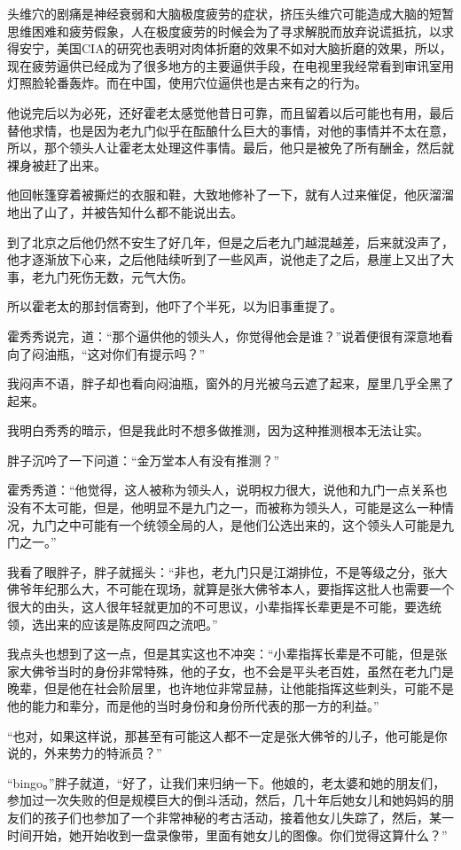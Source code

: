 头维穴的剧痛是神经衰弱和大脑极度疲劳的症状，挤压头维穴可能造成大脑的短暂思维困难和疲劳假象，人在极度疲劳的时候会为了寻求解脱而放弃说谎抵抗，以求得安宁，美国CIA的研究也表明对肉体折磨的效果不如对大脑折磨的效果，所以，现在疲劳逼供已经成为了很多地方的主要逼供手段，在电视里我经常看到审讯室用灯照脸轮番轰炸。而在中国，使用穴位逼供也是古来有之的行为。

他说完后以为必死，还好霍老太感觉他昔日可靠，而且留着以后可能也有用，最后替他求情，也是因为老九门似乎在酝酿什么巨大的事情，对他的事情并不太在意，所以，那个领头人让霍老太处理这件事情。最后，他只是被免了所有酬金，然后就裸身被赶了出来。

他回帐篷穿着被撕烂的衣服和鞋，大致地修补了一下，就有人过来催促，他灰溜溜地出了山了，并被告知什么都不能说出去。

到了北京之后他仍然不安生了好几年，但是之后老九门越混越差，后来就没声了，他才逐渐放下心来，之后他陆续听到了一些风声，说他走了之后，悬崖上又出了大事，老九门死伤无数，元气大伤。

所以霍老太的那封信寄到，他吓了个半死，以为旧事重提了。

霍秀秀说完，道：“那个逼供他的领头人，你觉得他会是谁？”说着便很有深意地看向了闷油瓶，“这对你们有提示吗？”

我闷声不语，胖子却也看向闷油瓶，窗外的月光被乌云遮了起来，屋里几乎全黑了起来。

我明白秀秀的暗示，但是我此时不想多做推测，因为这种推测根本无法让实。

胖子沉吟了一下问道：“金万堂本人有没有推测？”

霍秀秀道：“他觉得，这人被称为领头人，说明权力很大，说他和九门一点关系也没有不太可能，但是，他明显不是九门之一，而被称为领头人，可能是这么一种情况，九门之中可能有一个统领全局的人，是他们公选出来的，这个领头人可能是九门之一。”

我看了眼胖子，胖子就摇头：“非也，老九门只是江湖排位，不是等级之分，张大佛爷年纪那么大，不可能在现场，就算是张大佛爷本人，要指挥这批人也需要一个很大的由头，这人很年轻就更加的不可思议，小辈指挥长辈更是不可能，要选统领，选出来的应该是陈皮阿四之流吧。”

我点头也想到了这一点，但是其实这也不冲突：“小辈指挥长辈是不可能，但是张家大佛爷当时的身份非常特殊，他的子女，也不会是平头老百姓，虽然在老九门是晚辈，但是他在社会阶层里，也许地位非常显赫，让他能指挥这些刺头，可能不是他的能力和辈分，而是他的当时身份和身份所代表的那一方的利益。”

“也对，如果这样说，那甚至有可能这人都不一定是张大佛爷的儿子，他可能是你说的，外来势力的特派员？”

“bingo。”胖子就道，“好了，让我们来归纳一下。他娘的，老太婆和她的朋友们，参加过一次失败的但是规模巨大的倒斗活动，然后，几十年后她女儿和她妈妈的朋友们的孩子们也参加了一个非常神秘的考古活动，接着他女儿失踪了，然后，某一时间开始，她开始收到一盘录像带，里面有她女儿的图像。你们觉得这算什么？”

